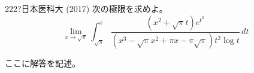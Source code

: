 \begin{thm}{222}{\hosi ?}{日本医科大 (2017)}
 次の極限を求めよ。 \\
 \[ \lim_{x\to\sqrt{\pi}} \int_{\sqrt{\pi}}^x\! \frac{(x^2+\sqrt{\pi}t)e^{t^2}}{(x^3-\sqrt{\pi}x^2+\pi x-\pi\sqrt{\pi})t^2\log t} \,dt \]
\end{thm}

ここに解答を記述。